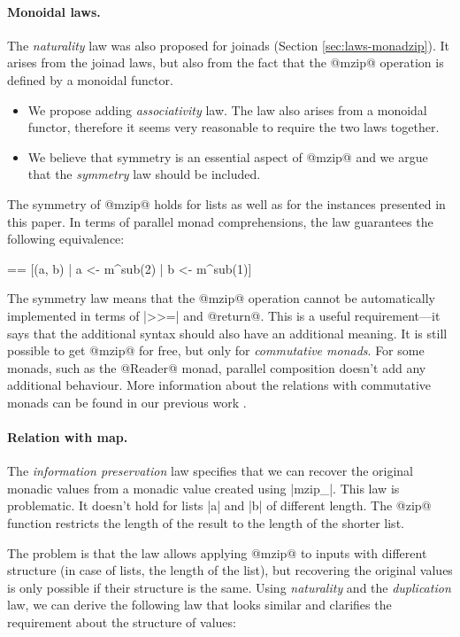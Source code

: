 \documentclass[preprint]{sigplanconf}
\begin{document}
\paragraph{Monoidal laws.}
The \textit{naturality} law was also proposed for joinads (Section \ref{sec:laws-monadzip}). It
arises from the joinad laws, but also from the fact that the @mzip@ operation is defined by a 
monoidal functor. 

\begin{itemize}
\item We propose adding \textit{associativity} law. The law also arises from a monoidal functor,
  therefore it seems very reasonable to require the two laws together.
  
\item We believe that symmetry is an essential aspect of @mzip@ and we argue that 
  the \textit{symmetry} law should be included.

\end{itemize}
The symmetry of @mzip@ holds for lists as well as for the  instances presented in 
this paper. In terms of parallel monad comprehensions, the law guarantees the following 
equivalence:

\begin{code}
 == [(a, b) | a <- m^sub(2) | b <- m^sub(1)]
\end{code}
The symmetry law means that the @mzip@ operation cannot be automatically implemented in 
terms of |>>=| and @return@. This is a useful requirement---it says that the additional syntax
should also have an additional meaning. It is still possible to get @mzip@ for free, 
but only for \textit{commutative monads}. For some monads, such as the @Reader@ monad, parallel 
composition doesn't add any additional behaviour. More information about the relations with 
commutative monads can be found in our previous work \cite{joinads, eventsthesis}.

\paragraph{Relation with map.}
The \textit{information preservation} law specifies that we can recover the original monadic values 
from a monadic value created using |mzip_|. This law is problematic. It doesn't hold for lists |a| 
and |b| of different length. The @zip@ function restricts the length of the result to the length 
of the shorter list.

The problem is that the law allows applying @mzip@ to inputs with different structure (in case of 
lists, the length of the list), but recovering the original values is only possible if their 
structure is the same. Using \textit{naturality} and the \textit{duplication} law, we can derive the
following law that looks similar and clarifies the requirement about the structure of values:
\end{document}
